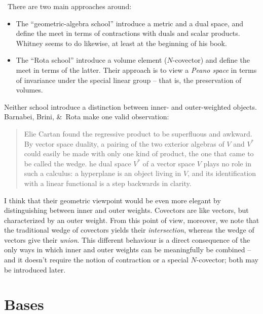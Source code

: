 \documentclass[\ifafour a4paper,12pt,\else a5paper,10pt,\fi%
onecolumn,oneside,article,%
british%
]{memoir}
\theoremstyle{remark}
\theoremstyle{innote}
\newcommand*{\amp}{\&}
\renewcommand*{\|}{\nonscript\,\vert\nonscript\;\mathopen{}}
\newcommand*{\puzzle}{{\fontencoding{U}\fontfamily{fontawesometwo}\selectfont\symbol{225}}}
\newcommand{\mynote}[1]{ {\color{notecolour}\puzzle\ #1}}
\newcommand*{\yN}{N}
\begin{document}
\mynote{There are two main approaches around:
  \begin{itemize}
  \item The \enquote{geometric-algebra school} introduce a metric and a
    dual space, and define the meet in terms of contractions with duals and
    scalar products. Whitney seems to do likewise, at least at the
    beginning of his book.
  \item The \enquote{Rota school} introduce a volume element
    ($\yN$-covector) and define the meet in terms of the latter. Their
    approach is to view a \emph{Peano space} in terms of invariance under
    the special linear group -- that is, the preservation of volumes.
  \end{itemize}
  Neither school introduce a distinction between inner- and outer-weighted
  objects. Barnabei, Brini, \amp\ Rota make one valid observation:
  \begin{quote}\small
    Elie Cartan found the regressive product to be superfluous and awkward.
    By vector space duality, a pairing of the two exterior algebras of $V$
    and $V^*$ could easily be made with only one kind of product, the one
    that came to be called the wedge. \textelp{However, T}he dual space
    $V^*$ of a vector space $V$ plays no role in such a calculus: a
    hyperplane is an object living in $V$, and its identification with a
    linear functional is a step backwards in clarity.
  \end{quote}
  I think that their geometric viewpoint would be even more elegant by
  distinguishing between inner and outer weights. Covectors are like
  vectors, but characterized by an outer weight. From this point of view,
  moreover, we note that the traditional wedge of covectors yields their
  \emph{intersection}, whereas the wedge of vectors give their
  \emph{union}. This different behaviour is a direct consequence of the
  only ways in which inner and outer weights can be meaningfully be
  combined -- and it doesn't require the notion of contraction or a special
  $\yN$-covector; both may be introduced later. }



\section{Bases}
\label{sec:bases}

\bigskip
\end{document}
